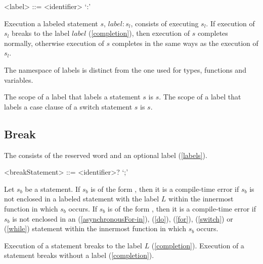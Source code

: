 \documentclass[makeidx]{article}
\begin{document}
{

\begin{grammar}
<label> ::= <identifier> `:'
\end{grammar}

\LMHash{}%
Execution a labeled statement $s$, $label: s_l$, consists of executing $s_l$.
If execution of $s_l$ breaks to the label $label$ (\ref{completion}),
then execution of $s$ completes normally,
otherwise execution of $s$ completes in the same ways as the execution of $s_l$.

\LMHash{}%
The namespace of labels is distinct from the one used for types, functions and variables.

\LMHash{}%
The scope of a label that labels a statement $s$ is $s$.
The scope of a label that labels a case clause of a switch statement $s$ is $s$.



\subsection{Break}

\LMHash{}%
The  consists of the reserved word \BREAK{} and an optional label (\ref{labels}).

\begin{grammar}
<breakStatement> ::= \BREAK{} <identifier>? `;'
\end{grammar}

\LMHash{}%
Let $s_b$ be a \BREAK{} statement.
If $s_b$ is of the form ,
then it is a compile-time error if $s_b$ is not enclosed in a labeled statement
with the label $L$ within the innermost function in which $s_b$ occurs.
If $s_b$ is of the form \code{\BREAK{};},
then it is a compile-time error if $s_b$ is not enclosed in an
\code{\AWAIT{} \FOR{}} (\ref{asynchronousFor-in}),
\DO{} (\ref{do}), \FOR{} (\ref{for}), \SWITCH{} (\ref{switch})
or \WHILE{} (\ref{while}) statement within the innermost function in which $s_b$ occurs.

\LMHash{}%
Execution of a \BREAK{} statement  breaks to the label $L$ (\ref{completion}).
Execution of a \BREAK{} statement \code{\BREAK{};} breaks without a label (\ref{completion}).


}
\end{document}
